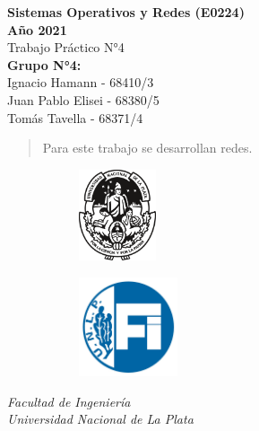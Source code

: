     \begin{titlepage}
        \begin{center}
            \vspace*{0.5cm}
            \huge
            \textbf{Sistemas Operativos y Redes (E0224) \\ Año 2021}    %
            \\
            \vspace{0.5cm}
            Trabajo Práctico N°4                                        %
            \\
            \vspace{2cm}
            \Large
            \textbf{Grupo N°4:}
            \\
            \large
            \vspace{0.2cm}
            Ignacio Hamann - 68410/3
            \\
            Juan Pablo Elisei - 68380/5
            \\
            Tomás Tavella - 68371/4
            \\
            \vspace{2cm}
            \begin{abstract}
                Para este trabajo se desarrollan redes.
            \end{abstract}
            \vfill
            \begin{figure}[H]
                \centering
                \begin{subfigure}
                    \centering
                    \includegraphics[width=0.25\textwidth]{Imagenes/UNLP.pdf}
                \end{subfigure}
                \begin{subfigure}
                    \centering
                    \includegraphics[width=0.32\textwidth]{Imagenes/FI.jpg}
                \end{subfigure}
            \end{figure}
            \vspace{1cm}
            \textit{
            Facultad de Ingeniería
            \\
            Universidad Nacional de La Plata}
            \vspace{1cm}
        \end{center}
    \end{titlepage}